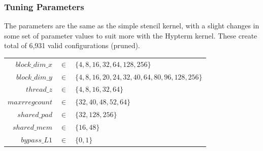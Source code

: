 \subsubsection{Tuning Parameters}
The parameters are the same as the simple stencil kernel, with a slight changes in some set of parameter values to suit more with the Hypterm kernel. These create total of 6,931 valid configurations (pruned).
\begin{table}[h]
\center
\begin{tabular}{r c l}
$block\_dim\_x$ & $\in$ & $\{4, 8, 16, 32, 64, 128, 256\}$	\\
$block\_dim\_y$ & $\in$ & $\{4, 8, 16, 20, 24, 32, 40, 64, 80, 96, 128, 256\}$	\\
$thread\_z$     & $\in$ & $\{4, 8, 16, 32, 64\}$			\\
$maxrregcount$  & $\in$ & $\{32, 40, 48, 52, 64\}$			\\
$shared\_pad$   & $\in$ & $\{32, 128, 256\}$				\\
$shared\_mem$   & $\in$ & $\{16, 48\}$						\\
$bypass\_L1$    & $\in$ & $\{0, 1\}$						\\
\end{tabular}
\end{table}


